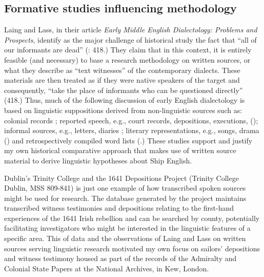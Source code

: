 \subsection{{Formative studies influencing methodology}}\label{sec:2.2.2}

Laing and Lass, in their article \textit{Early Middle English Dialectology: Problems and Prospects}, identify as the major challenge of historical  study the fact that “all of our informants are dead” (\citeyear*{LaingLass2006}: 418.) They claim that in this context, it is entirely feasible (and necessary) to base a research methodology on written sources, or what they describe as “text witnesses” of the contemporary dialects. These materials are then treated as if they were native speakers of the target  and consequently, “take the place of informants who can be questioned directly” (418.) Thus, much of the following discussion of early English dialectology is based on linguistic suppositions derived from non-linguistic sources such as: colonial records \citep{Maynor1988}; reported speech, e.g., court records, depositions, executions, (\citealt{Awbery1988,Tagliamonte2013}); informal sources, e.g., letters, diaries \citep{Tagliamonte2013}; literary representations, e.g., songs, drama (\citealt{Russell1883,Wright1967}) and retrospectively compiled word lists (\citealt{Wright1967,Smith1968}.) These studies support and justify my own historical comparative approach that makes use of written source material to derive linguistic hypotheses about Ship English. 

Dublin’s Trinity College and the 1641 Depositions Project (Trinity College Dublin, MSS 809-841) is just one example of how transcribed spoken sources might be used for research. The database generated by the project maintains transcribed witness testimonies and depositions relating to the first-hand experiences of the 1641 Irish rebellion and can be searched by county, potentially facilitating investigators who might be interested in the linguistic features of a specific area. This  of data and the observations of Laing and Lass on written sources serving linguistic research motivated my own focus on sailors’ depositions and witness testimony housed as part of the records of the Admiralty and Colonial State Papers at the National Archives, in Kew, London. 

